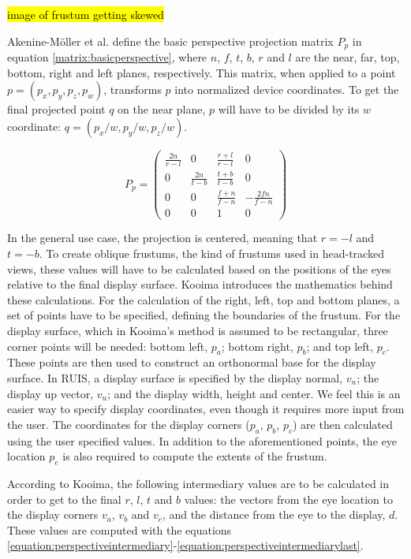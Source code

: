 \documentclass[12pt,a4paper,oneside,pdftex]{report}
\begin{document}
\hl{image of frustum getting skewed}

Akenine-Möller et al. \cite{RTR3} define the basic perspective projection matrix $P_p$ in equation \eqref{matrix:basicperspective}, where $n$, $f$, $t$, $b$, $r$ and $l$ are the near, far, top, bottom, right and left planes, respectively. This matrix, when applied to a point $p = (p_x, p_y, p_z, p_w)$, transforms $p$ into normalized device coordinates. To get the final projected point $q$ on the near plane, $p$ will have to be divided by its $w$ coordinate: $q = (p_x/w, p_y/w, p_z/w)$.

\begin{equation}
\label{matrix:basicperspective}
P_p = \begin{pmatrix}
  \frac{2n}{r-l} & 0 & \frac{r+l}{r-l} & 0 \\[0.3em]
  0 & \frac{2n}{t-b} & \frac{t+b}{t-b} & 0 \\[0.3em]
  0 & 0 & \frac{f+n}{f-n} & - \frac{2fn}{f-n} \\[0.3em]
  0 & 0 & 1 & 0
 \end{pmatrix}
 \end{equation}
 
In the general use case, the projection is centered, meaning that $r = -l$ and $t = -b$. To create oblique frustums, the kind of frustums used in head-tracked views, these values will have to be calculated based on the positions of the eyes relative to the final display surface. Kooima \cite{KooimaPerspective} introduces the mathematics behind these calculations. For the calculation of the right, left, top and bottom planes, a set of points have to be specified, defining the boundaries of the frustum. For the display surface, which in Kooima's method is assumed to be rectangular, three corner points will be needed: bottom left, $p_a$; bottom right, $p_b$; and top left, $p_c$. These points are then used to construct an orthonormal base for the display surface. In RUIS, a display surface is specified by the display normal, $v_n$; the display up vector, $v_u$; and the display width, height and center. We feel this is an easier way to specify display coordinates, even though it requires more input from the user. The coordinates for the display corners ($p_a$, $p_b$, $p_c$) are then calculated using the user specified values. In addition to the aforementioned points, the eye location $p_e$ is also required to compute the extents of the frustum.

According to Kooima, the following intermediary values are to be calculated in order to get to the final $r$, $l$, $t$ and $b$ values: the vectors from the eye location to the display corners $v_a$, $v_b$ and $v_c$, and the distance from the eye to the display, $d$. These values are computed with the equations \eqref{equation:perspectiveintermediary}-\eqref{equation:perspectiveintermediarylast}.
\end{document}
